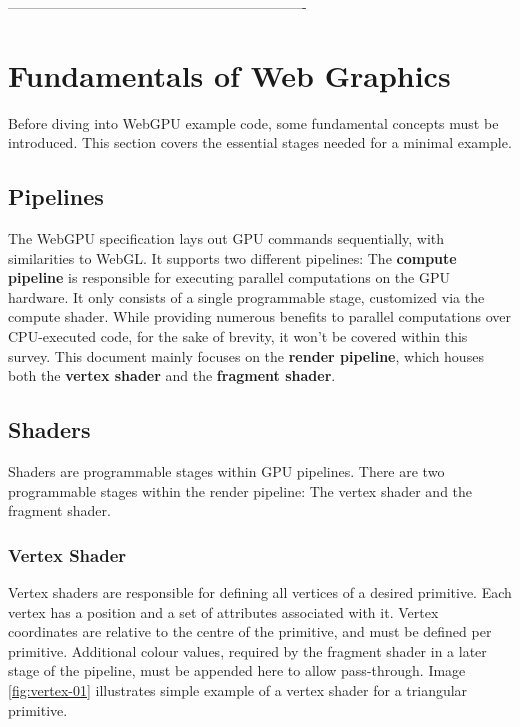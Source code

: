 ----------------------------------------------------------------
%
%
% 
% 

\chapter{Fundamentals of Web Graphics}

\label{chap:Fundamentals}

Before diving into WebGPU example code, some fundamental concepts must be introduced.
This section covers the essential stages needed for a minimal example.

\section{Pipelines}
The WebGPU specification lays out GPU commands sequentially, with similarities to WebGL.
It supports two different pipelines:
The \textbf{compute pipeline} is responsible for executing parallel
computations on the GPU hardware. It only consists of a single programmable
stage, customized via the compute shader.
While providing numerous benefits to parallel computations over CPU-executed code, for the sake of brevity, it won't be covered within this survey.
This document mainly focuses on the \textbf{render pipeline}, which houses both the \textbf{vertex shader} and the \textbf{fragment shader}.

\section{Shaders}
Shaders are programmable stages within GPU pipelines.
There are two programmable stages within the render pipeline:
The vertex shader and the fragment shader.

\subsection{Vertex Shader}
Vertex shaders are responsible for defining all vertices of a desired primitive.
Each vertex has a position and a set of attributes associated with it.
Vertex coordinates are relative to the centre of the primitive, and must be defined per primitive.
Additional colour values, required by the fragment shader in a later stage of the pipeline, must be appended here to allow pass-through.
Image \ref{fig:vertex-01} illustrates simple example of a vertex shader for a triangular primitive.

